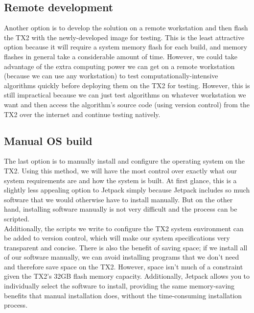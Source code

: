 \subsection{Remote development}
Another option is to develop the solution on a remote workstation and then flash the TX2 with the newly-developed image for testing. This is the least attractive option because it will require a system memory flash for each build, and memory flashes in general take a considerable amount of time. However, we could take advantage of the extra computing power we can get on a remote workstation (because we can use any workstation) to test computationally-intensive algorithms quickly before deploying them on the TX2 for testing. However, this is still impractical because we can just test algorithms on whatever workstation we want and then access the algorithm's source code (using version control) from the TX2 over the internet and continue testing natively.

\subsection{Manual OS build}
The last option is to manually install and configure the operating system on the TX2. Using this method, we will have the most control over exactly what our system requirements are and how the system is built. At first glance, this is a slightly less appealing option to Jetpack simply because Jetpack includes so much software that we would otherwise have to install manually. But on the other hand, installing software manually is not very difficult and the process can be scripted. \\

Additionally, the scripts we write to configure the TX2 system environment can be added to version control, which will make our system specifications very transparent and concise. There is also the benefit of saving space; if we install all of our software manually, we can avoid installing programs that we don't need and therefore save space on the TX2. However, space isn't much of a constraint given the TX2's 32GB flash memory capacity. Additionally, Jetpack allows you to individually select the software to install, providing the same memory-saving benefits that manual installation does, without the time-consuming installation process.

